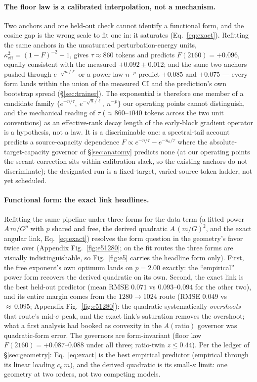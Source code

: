 \paragraph{The floor law is a calibrated interpolation, not a
mechanism.}
Two anchors and one held-out check cannot identify a functional form,
and the cosine gap is the wrong scale to fit one in: it saturates
(Eq.~\ref{eq:exact}). Refitting the same anchors in the unsaturated
perturbation-energy units,
$\kappa_{\mathrm{eff}}^2 = (1-F)^{-2} - 1$, gives
$\tau \approx 860$ tokens and predicts $F(2160) = +0.096$, equally
consistent with the measured $+0.092 \pm 0.012$; and the same two
anchors pushed through $e^{-\sqrt{n}/\ell}$ or a power law $n^{-p}$
predict $+0.085$ and $+0.075$ --- every form lands within the union of
the measured CI and the prediction's own bootstrap spread
(\S\ref{sec:trainer}). The exponential is therefore one member of a
candidate family $\{e^{-n/\tau},\ e^{-\sqrt{n}/\ell},\ n^{-p}\}$ our
operating points cannot distinguish, and the mechanical reading of
$\tau$ ($\approx 860$--$1040$ tokens across the two unit
conventions) as an effective-rank decay length of the early-block
gradient operator is a hypothesis, not a law. It is a discriminable
one: a spectral-tail account predicts a source-capacity dependence
$F \propto e^{-n/\tau} - e^{-n_0/\tau}$ where the
absolute-target-capacity governor of \S\ref{sec:anatomy} predicts
none (at our operating points the secant correction sits within
calibration slack, so the existing anchors do not discriminate); the
designated run is a fixed-target, varied-source token ladder, not yet
scheduled.

\paragraph{Functional form: the exact link headlines.}
Refitting the same pipeline under three forms for the data term (a
fitted power $A\,m/G^p$ with $p$ shared and free, the derived quadratic
$A\,(m/G)^2$, and the exact angular link, Eq.~\ref{eq:exact})
resolves the form question in the geometry's favor twice over
(Appendix Fig.~\ref{fig:e51280}; on the fit routes the three forms are
visually indistinguishable, so Fig.~\ref{fig:e5} carries the headline
form only). First, the free exponent's own optimum lands on
$p = 2.00$ exactly: the ``empirical'' power form recovers the derived
quadratic on its own. Second, the exact link is the best held-out
predictor (mean RMSE $0.071$ vs $0.093$--$0.094$ for the other two),
and its entire margin comes from the $1280{\to}1024$ route (RMSE
$0.049$ vs ${\approx}\,0.095$; Appendix Fig.~\ref{fig:e51280}): the
quadratic systematically
\emph{overshoots} that route's mid-$\sigma$ peak, and the exact link's
saturation removes the overshoot; what a first analysis had booked as
convexity in the $A(\mathrm{ratio})$ governor was quadratic-form error.
The governors are form-invariant (floor law $F(2160) = +0.087$--$0.088$
under all three; ratio-twin $z \le 0.44$). Per the ledger of
\S\ref{sec:geometry}: Eq.~\ref{eq:exact} is the best empirical
predictor (empirical through its linear loading $c_e\,m$), and the
derived quadratic is its small-$\kappa$ limit: one geometry at two
orders, not two competing models.

